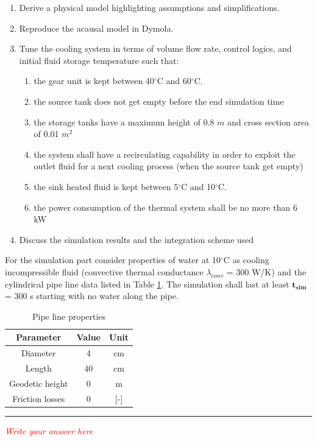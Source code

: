 \documentclass[11pt,a4paper,oneside]{article}
\newcommand{\tr}{\textcolor{red}}
\begin{document}
\begin{enumerate}
    \item Derive a physical model highlighting assumptions and simplifications.

    \item Reproduce the acausal model in Dymola.

    \item Tune the cooling system in terms of volume flow rate, control logics, and initial fluid storage temperature such that:
    \begin{enumerate}
    
        \item the gear unit is kept between 40$^{\circ}$C and 60$^{\circ}$C.
        
        \item the source tank does not get empty before the end simulation time

        \item the storage tanks have a maximum height of 0.8 $m$ and cross section area of 0.01 $m^2$
        
        \item the system shall have a recirculating capability in order to exploit the outlet fluid for a next cooling process (when the source tank get empty)
        
        \item the sink heated fluid is kept between 5$^{\circ}$C and 10$^{\circ}$C.

        \item the power consumption of the thermal system shall be no more than 6 kW 
        
    \end{enumerate}

    \item Discuss the simulation results and the integration scheme used
     
    
\end{enumerate}

\noindent For the simulation part consider properties of water at 10$^{\circ}$C as cooling incompressible fluid (convective thermal conductance $\lambda_{conv}$ = 300 W/K) and the cylindrical pipe line data listed in Table \ref{tab:pipe}. The simulation shall last at least $\mathbf{t_{sim}}$ = 300 s starting with no water along the pipe.


\begin{table}[h!]
    \centering
    \caption{Pipe line properties}
\begin{tabular}{ |c|c|c| } 
\hline
\textbf{Parameter} & \textbf{Value} & \textbf{Unit}\\
\hline
Diameter & 4 & cm  \\ 
Length & 40 & cm  \\ 
Geodetic height & 0 & m \\
Friction losses & 0 & [-] \\ 
\hline
\end{tabular}
\label{tab:pipe}
    \end{table}

    
\medskip


\medskip \hrule \medskip
{}

\tr{\textit{Write your answer here}}



\clearpage
\end{document}
